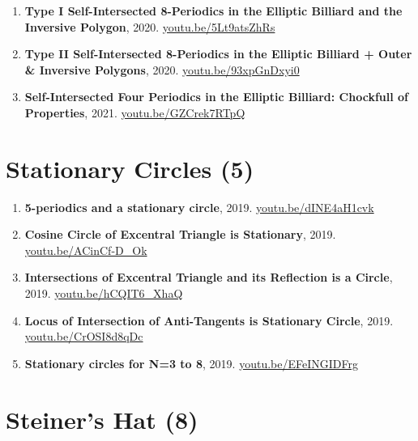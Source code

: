 \documentclass[12pt]{article}
\begin{document}
\begin{enumerate}[resume]
\item \textbf{Type I Self-Intersected 8-Periodics in the Elliptic Billiard and the Inversive Polygon}, 2020. \href{https://youtu.be/5Lt9atsZhRs}{\url{youtu.be/5Lt9atsZhRs}}
\item \textbf{Type II Self-Intersected 8-Periodics in the Elliptic Billiard + Outer \& Inversive Polygons}, 2020. \href{https://youtu.be/93xpGnDxyi0}{\url{youtu.be/93xpGnDxyi0}}
\item \textbf{Self-Intersected Four Periodics in the Elliptic Billiard: Chockfull of Properties}, 2021. \href{https://youtu.be/GZCrek7RTpQ}{\url{youtu.be/GZCrek7RTpQ}}
\end{enumerate}

\section{Stationary Circles (5)}

\begin{enumerate}[resume]
\item \textbf{5-periodics and a stationary circle}, 2019. \href{https://youtu.be/dINE4aH1cvk}{\url{youtu.be/dINE4aH1cvk}}
\item \textbf{Cosine Circle of Excentral Triangle is Stationary}, 2019. \href{https://youtu.be/ACinCf-D_Ok}{\url{youtu.be/ACinCf-D\_Ok}}
\item \textbf{Intersections of Excentral Triangle and its Reflection is a Circle}, 2019. \href{https://youtu.be/hCQIT6_XhaQ}{\url{youtu.be/hCQIT6\_XhaQ}}
\item \textbf{Locus of Intersection of Anti-Tangents is Stationary Circle}, 2019. \href{https://youtu.be/CrOSI8d8qDc}{\url{youtu.be/CrOSI8d8qDc}}
\item \textbf{Stationary circles for N=3 to 8}, 2019. \href{https://youtu.be/EFeINGIDFrg}{\url{youtu.be/EFeINGIDFrg}}
\end{enumerate}

\section{Steiner's Hat (8)}
\end{document}
